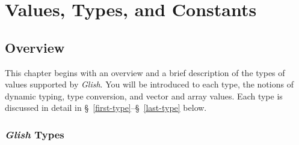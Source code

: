 
\chapter{Values, Types, and Constants}
\label{values-types-constants}

\section{Overview}

This chapter begins with an overview 
and a brief description of the types of values supported by
{\em Glish}.  You will be introduced
 to each type, the notions of dynamic typing, type conversion,
and vector and array values.  Each type is discussed in detail in
\S~\ref{first-type}--\S~\ref{last-type} below.

\subsection{{\em Glish} Types}

